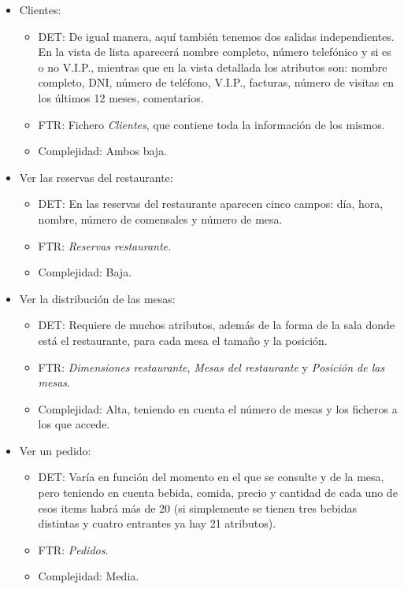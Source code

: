 \documentclass[spanish,a4paper,11pt, twoside]{report}	%
\begin{document}
\begin{itemize}
\begin{itemize}
		\end{itemize}
		\item{Clientes:} 
		\begin{itemize}
 			\item{DET:} De igual manera, aquí también tenemos dos salidas independientes. En la vista de lista aparecerá nombre completo, número telefónico y si es o no V.I.P., mientras que en la vista detallada los atributos son: nombre completo, DNI, número de teléfono, V.I.P., facturas, número de visitas en los últimos 12 meses, comentarios.
			\item{FTR:} Fichero \textit{Clientes}, que contiene toda la información de los mismos.
			\item{Complejidad:} Ambos baja.
		\end{itemize}
		\item{Ver las reservas del restaurante:} 
		\begin{itemize}
 			\item{DET:} En las reservas del restaurante aparecen cinco campos: día, hora, nombre, número de comensales y número de mesa.
			\item{FTR:} \textit{Reservas restaurante.}
			\item{Complejidad:} Baja.
		\end{itemize}
		\item{Ver la distribución de las mesas:} 
		\begin{itemize}
 			\item{DET:} Requiere de muchos atributos, además de la forma de la sala donde está el restaurante, para cada mesa el tamaño y la posición. 
			\item{FTR:} \textit{Dimensiones restaurante}, \textit{Mesas del restaurante} y \textit{Posición de las mesas}.
			\item{Complejidad:} Alta, teniendo en cuenta el número de mesas y los ficheros a los que accede.
		\end{itemize}
		\item{Ver un pedido:} 
		\begin{itemize}
 			\item{DET:} Varía en función del momento en el que se consulte y de la mesa, pero teniendo en cuenta bebida, comida, precio y cantidad de cada uno de esos items habrá más de 20 (si simplemente se tienen tres bebidas distintas y cuatro entrantes ya hay 21 atributos). 
			\item{FTR:} \textit{Pedidos}.
			\item{Complejidad:} Media.
		\end{itemize}

\end{itemize}
\end{document}
